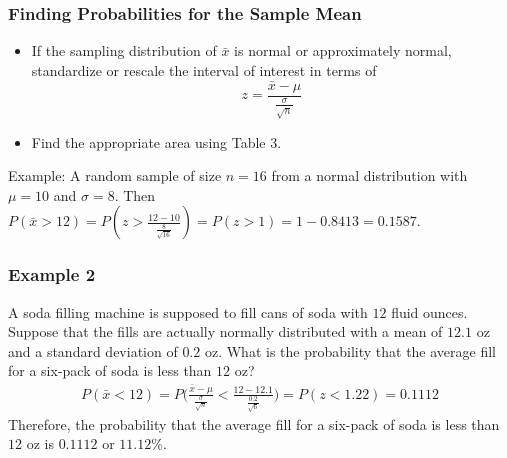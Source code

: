 \documentclass[12pt, letterpaper]{article}
\begin{document}
            \subsubsection{Finding Probabilities for the Sample Mean}
                \begin{itemize}
                    \item If the sampling distribution of $\bar{x}$ is normal or approximately normal, standardize or rescale the interval of interest in terms of $$z = \frac{\bar{x} - \mu}{\frac{\sigma}{\sqrt{n}}}$$
                    \item Find the appropriate area using Table 3.
                \end{itemize}
                Example: A random sample of size $n = 16$ from a normal distribution with $\mu = 10$ and $\sigma = 8$. Then $P(\bar{x} > 12) = P(z > \frac{12-10}{\frac{8}{\sqrt{16}}}) = P(z > 1) = 1 - 0.8413 = 0.1587$.
                \newpage\subsubsection*{Example 2}
                    A soda filling machine is supposed to fill cans of soda with $12$ fluid ounces. Suppose that the fills are actually normally distributed with a mean of $12.1$ oz and a standard deviation of $0.2$ oz. What is the probability that the average fill for a six-pack of soda is less than $12$ oz?
                    \begin{align*}
                        P(\bar{x} < 12) = P\bigg(\frac{\bar{x}-\mu}{\frac{\sigma}{\sqrt{n}}} < \frac{12 - 12.1}{\frac{0.2}{\sqrt{6}}}\bigg) = P(z < 1.22) = 0.1112
                    \end{align*}
                    Therefore, the probability that the average fill for a six-pack of soda is less than $12$ oz is $0.1112$ or $11.12\%$.
\end{document}
